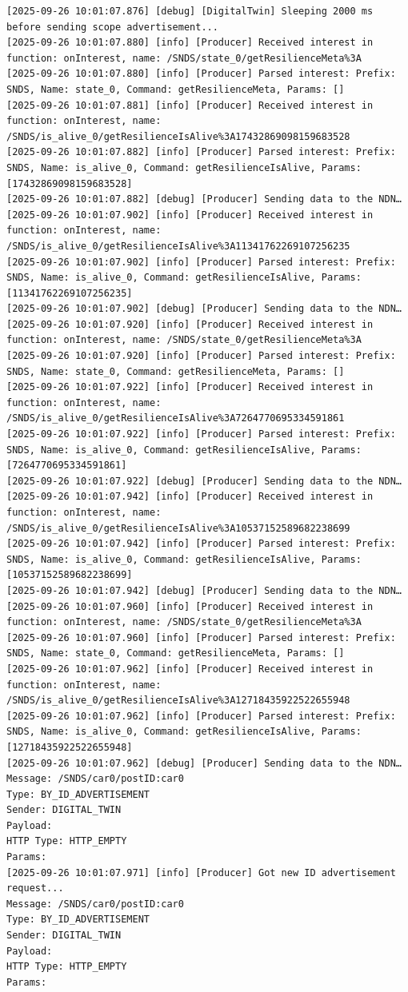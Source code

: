 \documentclass{article}
\begin{document}
\begin{lstlisting}[language=log,caption={Publish \textit{@id=car0}},label={lst:local-publish-inside-a}]
[2025-09-26 10:01:07.876] [debug] [DigitalTwin] Sleeping 2000 ms before sending scope advertisement...
[2025-09-26 10:01:07.880] [info] [Producer] Received interest in function: onInterest, name: /SNDS/state_0/getResilienceMeta%3A
[2025-09-26 10:01:07.880] [info] [Producer] Parsed interest: Prefix: SNDS, Name: state_0, Command: getResilienceMeta, Params: []
[2025-09-26 10:01:07.881] [info] [Producer] Received interest in function: onInterest, name: /SNDS/is_alive_0/getResilienceIsAlive%3A17432869098159683528
[2025-09-26 10:01:07.882] [info] [Producer] Parsed interest: Prefix: SNDS, Name: is_alive_0, Command: getResilienceIsAlive, Params: [17432869098159683528]
[2025-09-26 10:01:07.882] [debug] [Producer] Sending data to the NDN…
[2025-09-26 10:01:07.902] [info] [Producer] Received interest in function: onInterest, name: /SNDS/is_alive_0/getResilienceIsAlive%3A11341762269107256235
[2025-09-26 10:01:07.902] [info] [Producer] Parsed interest: Prefix: SNDS, Name: is_alive_0, Command: getResilienceIsAlive, Params: [11341762269107256235]
[2025-09-26 10:01:07.902] [debug] [Producer] Sending data to the NDN…
[2025-09-26 10:01:07.920] [info] [Producer] Received interest in function: onInterest, name: /SNDS/state_0/getResilienceMeta%3A
[2025-09-26 10:01:07.920] [info] [Producer] Parsed interest: Prefix: SNDS, Name: state_0, Command: getResilienceMeta, Params: []
[2025-09-26 10:01:07.922] [info] [Producer] Received interest in function: onInterest, name: /SNDS/is_alive_0/getResilienceIsAlive%3A7264770695334591861
[2025-09-26 10:01:07.922] [info] [Producer] Parsed interest: Prefix: SNDS, Name: is_alive_0, Command: getResilienceIsAlive, Params: [7264770695334591861]
[2025-09-26 10:01:07.922] [debug] [Producer] Sending data to the NDN…
[2025-09-26 10:01:07.942] [info] [Producer] Received interest in function: onInterest, name: /SNDS/is_alive_0/getResilienceIsAlive%3A10537152589682238699
[2025-09-26 10:01:07.942] [info] [Producer] Parsed interest: Prefix: SNDS, Name: is_alive_0, Command: getResilienceIsAlive, Params: [10537152589682238699]
[2025-09-26 10:01:07.942] [debug] [Producer] Sending data to the NDN…
[2025-09-26 10:01:07.960] [info] [Producer] Received interest in function: onInterest, name: /SNDS/state_0/getResilienceMeta%3A
[2025-09-26 10:01:07.960] [info] [Producer] Parsed interest: Prefix: SNDS, Name: state_0, Command: getResilienceMeta, Params: []
[2025-09-26 10:01:07.962] [info] [Producer] Received interest in function: onInterest, name: /SNDS/is_alive_0/getResilienceIsAlive%3A12718435922522655948
[2025-09-26 10:01:07.962] [info] [Producer] Parsed interest: Prefix: SNDS, Name: is_alive_0, Command: getResilienceIsAlive, Params: [12718435922522655948]
[2025-09-26 10:01:07.962] [debug] [Producer] Sending data to the NDN…
Message: /SNDS/car0/postID:car0
Type: BY_ID_ADVERTISEMENT
Sender: DIGITAL_TWIN
Payload: 
HTTP Type: HTTP_EMPTY
Params:
[2025-09-26 10:01:07.971] [info] [Producer] Got new ID advertisement request...
Message: /SNDS/car0/postID:car0
Type: BY_ID_ADVERTISEMENT
Sender: DIGITAL_TWIN
Payload: 
HTTP Type: HTTP_EMPTY
Params:


\end{lstlisting}
\end{document}
